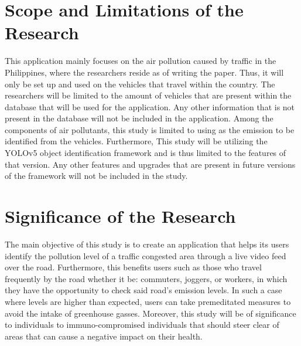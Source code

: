 \section{Scope and Limitations of the Research}
\label{sec:scopelimitations}
This application mainly focuses on the air pollution caused by traffic in the Philippines, where the researchers reside as of writing the paper. Thus, it will only be set up and used on the vehicles that travel within the country. The researchers will be limited to the amount of vehicles that are present within the database that will be used for the application. Any other information that is not present in the database will not be included in the application. Among the components of air pollutants, this study is limited to using  as the emission to be identified from the vehicles. Furthermore, This study will be utilizing the YOLOv5 object identification framework  and is thus limited to the features of that version. Any other features and upgrades that are present in future versions of the framework will not be included in the study.


\begin{comment}

%
%
Generally, one paragraph should be allotted for each of your research objectives.

Each paragraph contains a brief overview of the concept/theory and the purpose of doing the associated objective.

Each paragraph also includes a description of the scope/limitation of your study.

* Please refer to the slides for examples.

\end{comment}


\section{Significance of the Research}
\label{sec:significance}

The main objective of this study is to create an application that helps its users identify the pollution level of a traffic congested area through a live video feed over the road. Furthermore, this benefits users such as those who travel frequently by the road whether it be: commuters, joggers, or workers, in which they have the opportunity to check said road’s emission levels. In such a case where levels are higher than expected, users can take premeditated measures to avoid the intake of greenhouse gasses. Moreover, this study will be of significance to individuals to immuno-compromised individuals that should steer clear of areas that can cause a negative impact on their health. 

